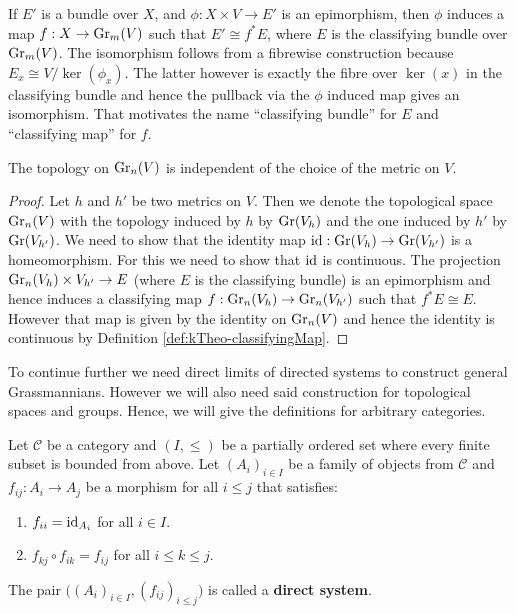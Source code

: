 \begin{corollary}
	If $E'$ is a bundle over $X$, and $\phi: X\times V\to E'$ is an epimorphism, then $\phi$ induces a map $f:X\to \operatorname{\mathrm{Gr}}_{m}(V)$ such that $E'\cong f^*E$, where $E$ is the classifying bundle over $\operatorname{\mathrm{Gr}}_{m}(V)$. The isomorphism follows from a fibrewise construction because $E_x\cong V\big/\ker(\phi_x)$. The latter however is exactly the fibre over $\ker(x)$ in the classifying bundle and hence the pullback via the $\phi$ induced map gives an isomorphism. That motivates the name \enquote{classifying bundle} for $E$ and \enquote{classifying map} for $f$.
\end{corollary}
 \begin{lemma}\label{lem:kTheo-GrassmanTopologyMetricInvariant}
	The topology on $\operatorname{\mathrm{Gr}}_n(V)$ is independent of the choice of the metric on $V$.
 \end{lemma}
 \begin{proof}
	Let $h$ and $h'$ be two metrics on $V$. Then we denote the topological space $\operatorname{\mathrm{Gr}}_n(V)$ with the topology induced by $h$  by $\operatorname{\mathrm{Gr}}(V_h)$ and the one induced by $h'$ by $\operatorname{\mathrm{Gr}}(V_{h'})$. We need to show that the identity map $\operatorname{\mathrm{id}}:\operatorname{\mathrm{Gr}}(V_h)\to \operatorname{\mathrm{Gr}}(V_{h'})$ is a homeomorphism. For this we need to show that $\operatorname{\mathrm{id}}$ is continuous. The projection $\operatorname{\mathrm{Gr}}_n(V_h)\times V_{h'} \to E$ (where $E$ is the classifying bundle) is an epimorphism and hence induces a classifying map $f:\operatorname{\mathrm{Gr}}_n(V_h)\to \operatorname{\mathrm{Gr}}_n(V_{h'})$ such that $f^*E\cong E$. However that map is given by the identity on $\operatorname{\mathrm{Gr}}_n(V)$ and hence the identity is continuous by Definition \ref{def:kTheo-classifyingMap}. 
 \end{proof}
\begin{remark}
	To continue further we need direct limits of directed systems to construct general Grassmannians. However we will also need said construction for topological spaces and groups. Hence, we will give the definitions for arbitrary categories.
\end{remark}
\begin{definition}
	Let $\mathcal{C}$ be a category and $(I,\leq)$ be a partially ordered set where every finite subset is bounded from above. Let $(A_i)_{i\in I}$ be a family of objects from $\mathcal{C}$ and $f_{ij}:A_i\to A_j$ be a morphism for all $i\leq j$ that satisfies:
	\begin{enumerate}
		\item $f_{ii}= \operatorname{\mathrm{id}}_{A_i}$ for all $i\in I$.
		\item $f_{kj}\circ f_{ik}=f_{ij}$ for all $i\leq k\leq j$.
	\end{enumerate}
	The pair $\big((A_i)_{i\in I},(f_{ij})_{i\leq j}\big)$ is called a \textbf{direct system}. 
\end{definition}
